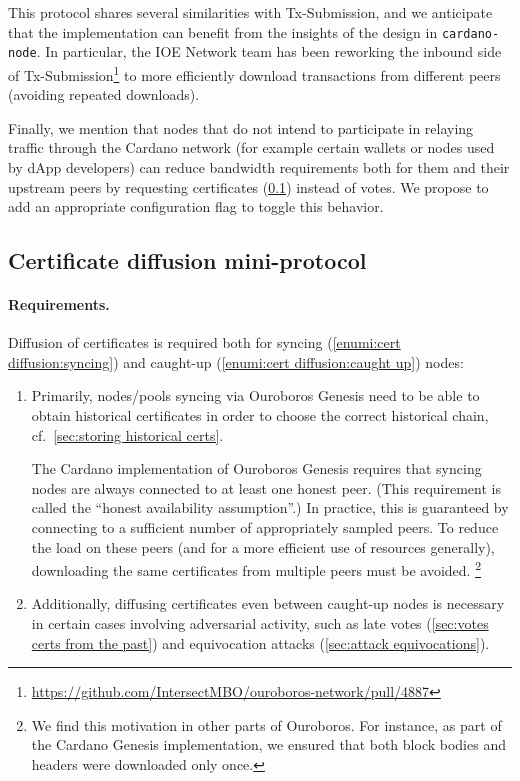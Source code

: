 This protocol shares several similarities with Tx-Submission, and we anticipate that the implementation can benefit from the insights of the design in \texttt{cardano-node}.
In particular, the IOE Network team has been reworking the inbound side of Tx-Submission\footnote{\url{https://github.com/IntersectMBO/ouroboros-network/pull/4887}} to more efficiently download transactions from different peers (avoiding repeated downloads).

Finally, we mention that nodes that do not intend to participate in relaying traffic through the Cardano network (for example certain wallets or nodes used by dApp developers) can reduce bandwidth requirements both for them and their upstream peers by requesting certificates (\cref{sec:certificate-diffusion}) instead of votes.
We propose to add an appropriate configuration flag to toggle this behavior.

\subsection{Certificate diffusion mini-protocol}%
\label{sec:certificate-diffusion}

\paragraph{Requirements.}

Diffusion of certificates is required both for syncing (\ref{enumi:cert diffusion:syncing}) and caught-up (\ref{enumi:cert diffusion:caught up}) nodes:

\begin{enumerate}
\item\label{enumi:cert diffusion:syncing}
  Primarily, nodes/pools syncing via Ouroboros Genesis need to be able to obtain historical certificates in order to choose the correct historical chain, cf.~\cref{sec:storing historical certs}.

  The Cardano implementation of Ouroboros Genesis \parencite{genesis-implementation-documentation} requires that syncing nodes are always connected to at least one honest peer.
(This requirement is called the \enquote{honest availability assumption}.)
In practice, this is guaranteed by connecting to a sufficient number of appropriately sampled peers.
To reduce the load on these peers (and for a more efficient use of resources generally), downloading the same certificates from multiple peers must be avoided.%
%
\footnote{We find this motivation in other parts of Ouroboros. For instance, as part of the Cardano Genesis implementation, we ensured that both block bodies and headers were downloaded only once.\cite{genesis-implementation-documentation}}
\item\label{enumi:cert diffusion:caught up}
  Additionally, diffusing certificates even between caught-up nodes is necessary in certain cases involving adversarial activity, such as late votes (\cref{sec:votes certs from the past}) and equivocation attacks (\cref{sec:attack equivocations}).
\end{enumerate}

